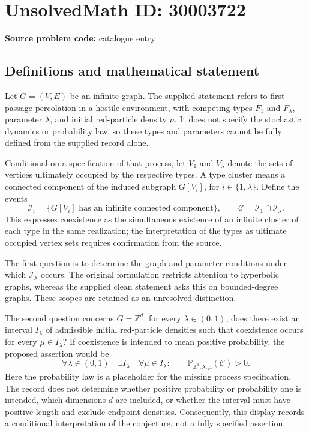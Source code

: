 \documentclass[11pt]{article}
\newcommand{\Z}{\mathbb{Z}}
\begin{document}
\section*{UnsolvedMath ID: 30003722}
\textbf{Source problem code:} catalogue entry
\subsection{Definitions and mathematical statement}
Let \(G=(V,E)\) be an infinite graph. The supplied statement refers to first-passage percolation in a hostile environment, with competing types \(F_1\) and \(F_\lambda\), parameter \(\lambda\), and initial red-particle density \(\mu\). It does not specify the stochastic dynamics or probability law, so these types and parameters cannot be fully defined from the supplied record alone.

Conditional on a specification of that process, let \(V_1\) and \(V_\lambda\) denote the sets of vertices ultimately occupied by the respective types. A type cluster means a connected component of the induced subgraph \(G[V_i]\), for \(i\in\{1,\lambda\}\). Define the events
\[
\mathcal I_i=\{G[V_i]\text{ has an infinite connected component}\},
\qquad
\mathcal C=\mathcal I_1\cap\mathcal I_\lambda.
\]
This expresses coexistence as the simultaneous existence of an infinite cluster of each type in the same realization; the interpretation of the types as ultimate occupied vertex sets requires confirmation from the source.

The first question is to determine the graph and parameter conditions under which \(\mathcal I_\lambda\) occurs. The original formulation restricts attention to hyperbolic graphs, whereas the supplied clean statement asks this on bounded-degree graphs. These scopes are retained as an unresolved distinction.

The second question concerns \(G=\Z^d\): for every \(\lambda\in(0,1)\), does there exist an interval \(I_\lambda\) of admissible initial red-particle densities such that coexistence occurs for every \(\mu\in I_\lambda\)? If coexistence is intended to mean positive probability, the proposed assertion would be
\[
\forall\lambda\in(0,1)\quad
\exists I_\lambda\quad
\forall\mu\in I_\lambda:\qquad
\mathbb P_{\Z^d,\lambda,\mu}(\mathcal C)>0.
\]
Here the probability law is a placeholder for the missing process specification. The record does not determine whether positive probability or probability one is intended, which dimensions \(d\) are included, or whether the interval must have positive length and exclude endpoint densities. Consequently, this display records a conditional interpretation of the conjecture, not a fully specified assertion.
\end{document}
